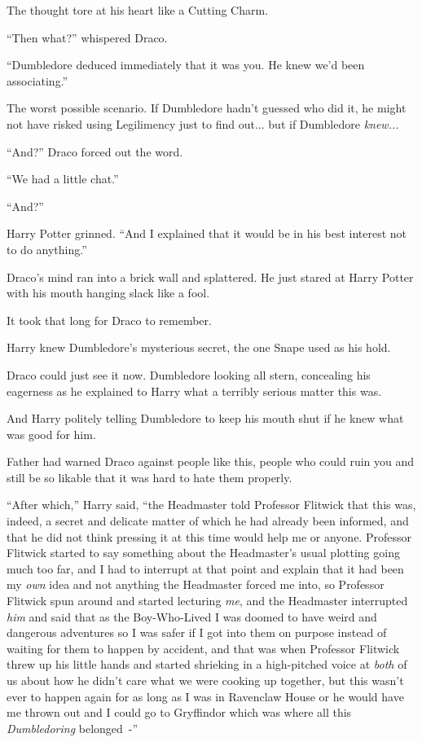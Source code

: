 The thought tore at his heart like a Cutting Charm.

``Then what?'' whispered Draco.

``Dumbledore deduced immediately that it was you. He knew we'd been associating.''

The worst possible scenario. If Dumbledore hadn't guessed who did it, he might not have risked using Legilimency just to find out... but if Dumbledore \emph{knew...}

``And?'' Draco forced out the word.

``We had a little chat.''

``And?''

Harry Potter grinned. ``And I explained that it would be in his best interest not to do anything.''

Draco's mind ran into a brick wall and splattered. He just stared at Harry Potter with his mouth hanging slack like a fool.

It took that long for Draco to remember.

Harry knew Dumbledore's mysterious secret, the one Snape used as his hold.

Draco could just see it now. Dumbledore looking all stern, concealing his eagerness as he explained to Harry what a terribly serious matter this was.

And Harry politely telling Dumbledore to keep his mouth shut if he knew what was good for him.

Father had warned Draco against people like this, people who could ruin you and still be so likable that it was hard to hate them properly.

``After which,'' Harry said, ``the Headmaster told Professor Flitwick that this was, indeed, a secret and delicate matter of which he had already been informed, and that he did not think pressing it at this time would help me or anyone. Professor Flitwick started to say something about the Headmaster's usual plotting going much too far, and I had to interrupt at that point and explain that it had been my \emph{own} idea and not anything the Headmaster forced me into, so Professor Flitwick spun around and started lecturing \emph{me}, and the Headmaster interrupted \emph{him} and said that as the Boy-Who-Lived I was doomed to have weird and dangerous adventures so I was safer if I got into them on purpose instead of waiting for them to happen by accident, and that was when Professor Flitwick threw up his little hands and started shrieking in a high-pitched voice at \emph{both} of us about how he didn't care what we were cooking up together, but this wasn't ever to happen again for as long as I was in Ravenclaw House or he would have me thrown out and I could go to Gryffindor which was where all this \emph{Dumbledoring} belonged~-''

